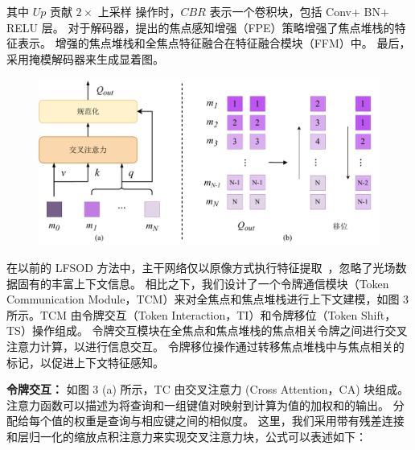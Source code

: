其中 $Up$ 贡献 $2 \times $ 上采样 操作时，$CBR$ 表示一个卷积块，包括 Conv+ BN+ RELU 层。 对于解码器，提出的焦点感知增强（FPE）策略增强了焦点堆栈的特征表示。 增强的焦点堆栈和全焦点特征融合在特征融合模块（FFM）中。 最后，采用掩模解码器来生成显着图。
%
%
%
%
%
%
%
%
%
%
\begin{figure}[!ht]
	\centering
	\includegraphics[width=0.95\linewidth]{figures/chapter3/token-interaction.drawio}
	\label{cpt3_fig1:idea}
\end{figure}
%
%
%
%
在以前的 LFSOD 方法中，主干网络仅以原像方式执行特征提取~\cite{piao2020exploit, liu2021light}，忽略了光场数据固有的丰富上下文信息。 相比之下，我们设计了一个令牌通信模块（Token Communication Module，TCM）来对全焦点和焦点堆栈进行上下文建模，如图 3 所示。TCM 由令牌交互（Token Interaction，TI）和令牌移位（Token Shift，TS）操作组成。 
令牌交互模块在全焦点和焦点堆栈的焦点相关令牌之间进行交叉注意力计算，以进行信息交互。 
令牌移位操作通过转移焦点堆栈中与焦点相关的标记，以促进上下文特征感知。 
%
%
%
%
%
\par
\textbf{令牌交互：}
如图 3 (a) 所示，TC 由交叉注意力 (Cross Attention，CA) 块组成。 注意力函数可以描述为将查询和一组键值对映射到计算为值的加权和的输出。 分配给每个值的权重是查询与相应键之间的相似度。 这里，我们采用带有残差连接和层归一化的缩放点积注意力来实现交叉注意力块，公式可以表述如下：
